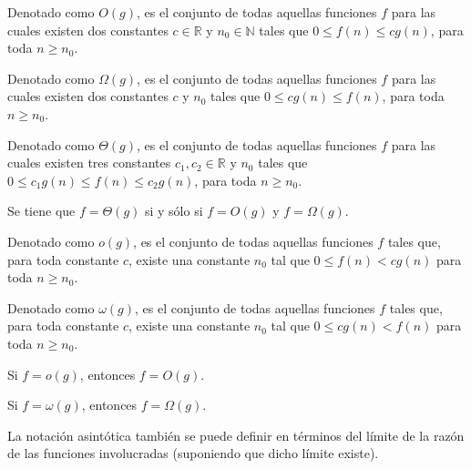 \begin{defn}[O grande]
    Denotado como $O(g)$, es el conjunto de todas aquellas funciones
    $f$ para las cuales existen dos constantes $c\in\mathbb{R}$ y $n_{0}\in\mathbb{N}$
    tales que $0\le f(n)\leq c g(n)$, para toda $n\geq n_{0}$. 
\end{defn}

\begin{defn}
    Denotado como $\Omega(g)$, es el conjunto de todas aquellas funciones
    $f$ para las cuales existen dos constantes $c$ y $n_{0}$ tales
    que $0\le c g(n)\leq f(n)$, para toda $n\geq n_{0}$.
\end{defn}

\begin{defn}
    Denotado como $\Theta(g)$, es el conjunto de todas aquellas funciones
    $f$ para las cuales existen tres constantes $c_{1},c_{2}\in\mathbb{R}$
    y $n_{0}$ tales que $0\le c_{1} g(n)\leq f(n)\leq c_{2} g(n)$,
    para toda $n\geq n_{0}$.
\end{defn}

\begin{prop}
    Se tiene que $f=\Theta(g)$ si y sólo si $f=O(g)$ y $f=\Omega(g)$.
\end{prop}

\begin{defn}[o chica]
    Denotado como $o(g)$, es el conjunto de todas aquellas funciones
    $f$ tales que, para toda constante $c$, existe una constante $n_{0}$
    tal que $0\leq f(n)<c g(n)$ para toda $n\geq n_{0}$.
\end{defn}

\begin{defn}
    Denotado como $\omega(g)$, es el conjunto de todas aquellas funciones
    $f$ tales que, para toda constante $c$, existe una constante $n_{0}$
    tal que $0\leq c g(n)<f(n)$ para toda $n\geq n_{0}$.
\end{defn}

\begin{prop}
    Si $f=o(g)$, entonces $f=O(g)$.
\end{prop}

\begin{prop}
    Si $f=\omega(g)$, entonces $f=\Omega(g)$.
\end{prop}

La notación asintótica también se puede definir en términos del límite
de la razón de las funciones involucradas (suponiendo que dicho límite
existe). 

